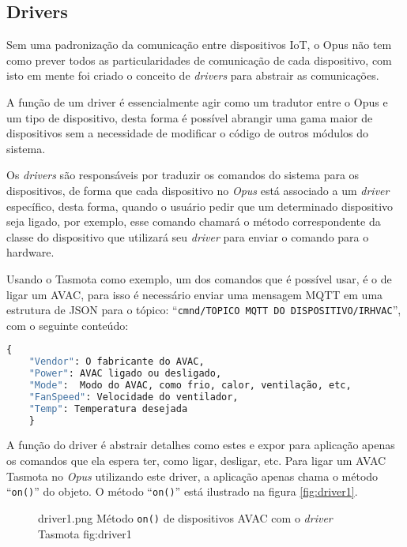 \subsection{Drivers}


Sem uma padronização da comunicação entre dispositivos IoT, o Opus não tem como prever todos as particularidades 
de comunicação de cada dispositivo, com isto em mente foi criado o conceito de \emph{drivers} para abstrair as comunicações.

A função de um driver é essencialmente agir como um tradutor entre o Opus e um tipo de dispositivo, desta forma é possível
abrangir uma gama maior de dispositivos sem a necessidade de modificar o código de outros módulos do sistema.





Os \emph{drivers} são responsáveis por traduzir os comandos do sistema para os dispositivos, de forma que cada dispositivo no \emph{Opus} está
associado a um \emph{driver} específico, desta forma, quando o usuário pedir que um determinado dispositivo seja ligado, por exemplo,
esse comando chamará o método correspondente da classe do dispositivo que utilizará seu \emph{driver} para enviar o comando para o hardware.

Usando o Tasmota como exemplo, um dos comandos que é possível usar, é o de ligar um AVAC, para isso é necessário enviar uma mensagem
MQTT em uma estrutura de JSON para o tópico: ``\lstinline{cmnd/TOPICO MQTT DO DISPOSITIVO/IRHVAC}'', com o seguinte conteúdo:
\begin{lstlisting}[language=Python]
    {
    "Vendor": O fabricante do AVAC,
    "Power": AVAC ligado ou desligado,
    "Mode":  Modo do AVAC, como frio, calor, ventilação, etc,
    "FanSpeed": Velocidade do ventilador,
    "Temp": Temperatura desejada
    }
\end{lstlisting}

A função do driver é abstrair detalhes como estes e expor para aplicação apenas os comandos que ela espera ter, como ligar, desligar, etc.
Para ligar um AVAC Tasmota no \emph{Opus} utilizando este driver, a aplicação apenas chama o método ``\lstinline{on()}'' do objeto. O
método ``\lstinline{on()}'' está ilustrado na figura \ref{fig:driver1}.
\begin{figure}[h!]
    {driver1.png}
    {Método \lstinline{on()} de dispositivos AVAC com o \emph{driver} Tasmota}
    {fig:driver1}
\end{figure}


